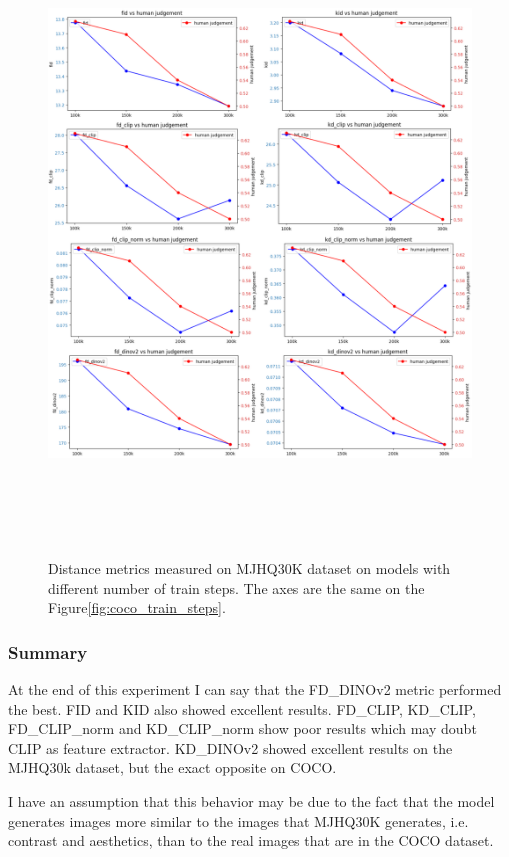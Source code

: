 \begin{figure}[]
\centering
\includegraphics[width=16cm, height=17cm]{figs/mjhq30k_train_steps.png}
\caption{Distance metrics measured on MJHQ30K dataset on models with different number of train steps. The axes are the same on the Figure\ref{fig:coco_train_steps}.}
\label{fig:mjhq30k_train_steps}
\end{figure}

\subsubsection{Summary}
At the end of this experiment I can say that the FD\_DINOv2 metric performed the best. FID and KID also showed excellent results. FD\_CLIP, KD\_CLIP, FD\_CLIP\_norm and KD\_CLIP\_norm show poor results which may doubt CLIP as feature extractor. KD\_DINOv2 showed excellent results on the MJHQ30k dataset, but the exact opposite on COCO.

I have an assumption that this behavior may be due to the fact that the model generates images more similar to the images that MJHQ30K generates, i.e. contrast and aesthetics, than to the real images that are in the COCO dataset.

